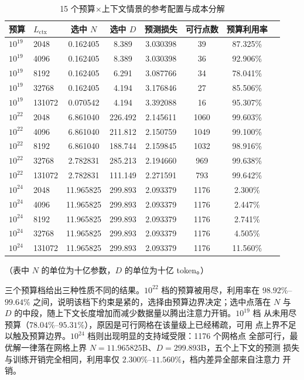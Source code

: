\documentclass[bwprint]{gmcmthesis}
\numberwithin{equation}{section}
\numberwithin{figure}{section}
\numberwithin{table}{section}
\begin{document}
\begin{table}[htp!]
\centering
\renewcommand\arraystretch{1.2}
\caption{15 个预算×上下文情景的参考配置与成本分解}\label{tab:q3-frontier}
\begin{tabular*}{\textwidth}{@{\extracolsep{\fill}}llcccccc@{}}
\toprule
预算 & $L_{\mathrm{ctx}}$ & 选中 $N$ & 选中 $D$ & 预测损失 & 可行点数 & 预算利用率 \\
\midrule
$10^{19}$ & 2048   & 0.162405 & 8.389   & 3.030398 & 39   & 87.325\% \\
$10^{19}$ & 4096   & 0.162405 & 8.389   & 3.030398 & 36   & 92.906\% \\
$10^{19}$ & 8192   & 0.162405 & 6.291   & 3.087766 & 34   & 78.041\% \\
$10^{19}$ & 32768  & 0.162405 & 4.194   & 3.176846 & 27   & 85.506\% \\
$10^{19}$ & 131072 & 0.070542 & 4.194   & 3.392088 & 16   & 95.307\% \\
$10^{22}$ & 2048   & 6.861040 & 226.492 & 2.145611 & 1060 & 99.603\% \\
$10^{22}$ & 4096   & 6.861040 & 211.812 & 2.150759 & 1049 & 99.100\% \\
$10^{22}$ & 8192   & 6.861040 & 188.744 & 2.159845 & 1032 & 98.916\% \\
$10^{22}$ & 32768  & 2.782831 & 285.213 & 2.194660 & 969  & 99.638\% \\
$10^{22}$ & 131072 & 2.782831 & 111.149 & 2.271591 & 793  & 99.642\% \\
$10^{24}$ & 2048   & 11.965825 & 299.893 & 2.093379 & 1176 & 2.300\% \\
$10^{24}$ & 4096   & 11.965825 & 299.893 & 2.093379 & 1176 & 2.447\% \\
$10^{24}$ & 8192   & 11.965825 & 299.893 & 2.093379 & 1176 & 2.741\% \\
$10^{24}$ & 32768  & 11.965825 & 299.893 & 2.093379 & 1176 & 4.505\% \\
$10^{24}$ & 131072 & 11.965825 & 299.893 & 2.093379 & 1176 & 11.560\% \\
\bottomrule
\end{tabular*}
\end{table}

（表中 $N$ 的单位为十亿参数，$D$ 的单位为十亿 token。）

三个预算档给出三种性质不同的结果。$10^{22}$ 档的预算被用尽，利用率在
$98.92\%$--$99.64\%$ 之间，说明该档下约束是紧的，选择由预算边界决定；选中点落在
$N$ 与 $D$ 的中段，随上下文长度增加而减少数据量以腾出注意力开销。$10^{19}$ 档
从未用尽预算（$78.04\%$--$95.31\%$），原因是可行网格在该量级上已经稀疏，可用
点上界不足以触及预算边界。$10^{24}$ 档则出现明显的支持域受限：1176 个网格点
全部可行，最优解一律落在网格上界 $N=11.965825$B、$D=299.893$B，五个上下文的预测
损失与训练开销完全相同，利用率仅 $2.300\%$--$11.560\%$，档内差异全部来自注意力
开销。
\end{document}
